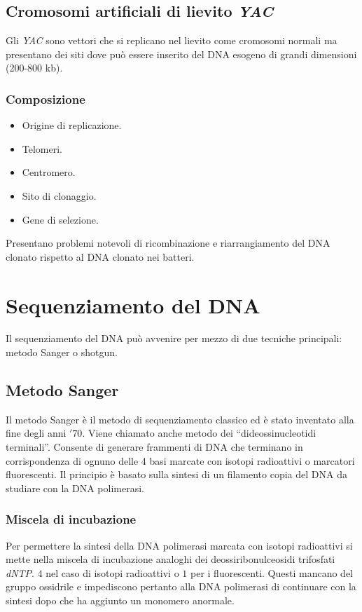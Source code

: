 	\subsection{Cromosomi artificiali di lievito \emph{YAC}}
	Gli \emph{YAC} sono vettori che si replicano nel lievito come cromosomi normali ma presentano dei siti dove pu\`o essere inserito del DNA esogeno di grandi dimensioni (200-800 kb).
	
		\subsubsection{Composizione}
		\begin{multicols}{2}
			\begin{itemize}
				\item Origine di replicazione.
				\item Telomeri.
				\item Centromero.
				\item Sito di clonaggio.
				\item Gene di selezione.
			\end{itemize}
		\end{multicols}
		Presentano problemi notevoli di ricombinazione e riarrangiamento del DNA clonato rispetto al DNA clonato nei batteri.

\section{Sequenziamento del DNA}
Il sequenziamento del DNA pu\`o avvenire per mezzo di due tecniche principali: metodo Sanger o shotgun.

	\subsection{Metodo Sanger}
	Il metodo Sanger \`e il metodo di sequenziamento classico ed \`e stato inventato alla fine degli anni $'70$. 
	Viene chiamato anche metodo dei ``dideossinucleotidi terminali''. 
	Consente di generare frammenti di DNA che terminano in corrispondenza di ognuno delle 4 basi marcate con isotopi radioattivi o marcatori fluorescenti. 
	Il principio \`e basato sulla sintesi di un filamento copia del DNA da studiare con la DNA polimerasi.

		\subsubsection{Miscela di incubazione}
		Per permettere la sintesi della DNA polimerasi marcata con isotopi radioattivi si mette nella miscela di incubazione analoghi dei deossiribonulceosidi trifosfati \emph{dNTP}.
		$4$ nel caso di isotopi radioattivi o $1$ per i fluorescenti.
		Questi mancano del gruppo ossidrile e impediscono pertanto alla DNA polimerasi di continuare con la sintesi dopo che ha aggiunto un monomero anormale.

